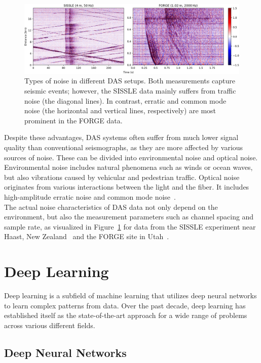\begin{figure}[b!]
    \includegraphics[width=\textwidth]{img/fig_2.2.png}
    \caption{
        Types of noise in different DAS setups.
        Both measurements capture seismic events; however, the SISSLE data mainly suffers from traffic noise
        (the diagonal lines).
        In contrast, erratic and common mode noise (the horizontal and vertical lines,
        respectively) are most prominent in the FORGE data.
    }
    \label{fig:das-noise}
\end{figure}

Despite these advantages, DAS systems often suffer from much lower signal quality than conventional seismographs,
as they are more affected by various sources of noise.
These can be divided into environmental noise and optical noise.
Environmental noise includes natural phenomena such as winds or ocean waves, but also vibrations caused by vehicular and
pedestrian traffic.
Optical noise originates from various interactions between the light and the fiber.
It includes high-amplitude erratic noise and common mode noise~\cite{IDF}.\\
The actual noise characteristics of DAS data not only depend on the environment, but also the measurement parameters
such as channel spacing and sample rate, as visualized in Figure~\ref{fig:das-noise} for data from the SISSLE experiment
near Haast, New Zealand~\cite{SISSLE} and the FORGE site in Utah~\cite{FORGE}.

\section{Deep Learning}

Deep learning is a subfield of machine learning that utilizes deep neural networks to learn complex patterns from data. 
Over the past decade, deep learning has established itself as the state-of-the-art approach for a wide range of problems
across various different fields.

\subsection{Deep Neural Networks}

